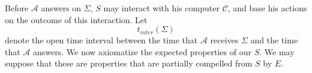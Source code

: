 \documentclass[9pt,twocolumn,twoside,lineno]{pnas-new}
\numberwithin{equation}{section}
\theoremstyle{definition}
\theoremstyle{remark}
\begin{document}





Before $\mathcal{A}$ answers on $\Sigma$, $S$ may interact with his computer $\mathcal{C} $, and base his actions on the outcome of this interaction. Let $$ t _{inter}  (\Sigma)  $$ denote the open time interval between the time that $\mathcal{A}$ receives $\Sigma$ and the time that $\mathcal{A}$ answers. We now axiomatize the expected properties of our $S$. We may suppose that these are properties that are partially compelled from $S$ by $E$.
\end{document}
